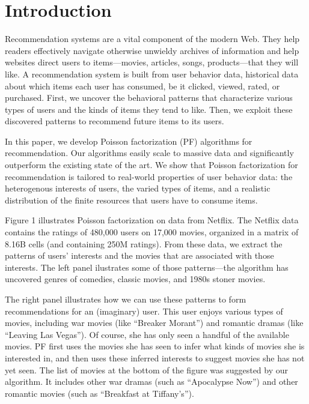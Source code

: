 \section{Introduction}

Recommendation systems are a vital component of the modern Web.  They
help readers effectively navigate otherwise unwieldy archives of
information and help websites direct users to items---movies,
articles, songs, products---that they will like.
A recommendation system is built from user behavior data, historical
data about which items each user has consumed, be it clicked, viewed,
rated, or purchased. First, we uncover the behavioral patterns that
characterize various types of users and the kinds of items they tend
to like.  Then, we exploit these discovered patterns to recommend
future items to its users.

In this paper, we develop Poisson factorization (PF) algorithms for
recommendation.  Our algorithms easily scale to massive data and
significantly outperform the existing state of the art.  We show that
Poisson factorization for recommendation is tailored to real-world
properties of user behavior data: the heterogenous interests of users,
the varied types of items, and a realistic distribution of the finite
resources that users have to consume items.

Figure 1 illustrates Poisson factorization on data from Netflix.  The
Netflix data contains the ratings of 480,000 users on 17,000 movies,
organized in a matrix of 8.16B cells (and containing 250M ratings).
From these data, we extract the patterns of users' interests and the
movies that are associated with those interests.  The left panel
ilustrates some of those patterns---the algorithm has uncovered genres
of comedies, classic movies, and 1980s stoner movies.

The right panel illustrates how we can use these patterns to form
recommendations for an (imaginary) user.  This user enjoys various
types of movies, including war movies (like ``Breaker Morant'') and
romantic dramas (like ``Leaving Las Vegas'').  Of course, she has only
seen a handful of the available movies.  PF first uses the movies she
has seen to infer what kinds of movies she is interested in, and then
uses these inferred interests to suggest movies she has not yet seen.
The list of movies at the bottom of the figure was suggested by our
algorithm. It includes other war dramas (such as ``Apocalypse Now'')
and other romantic movies (such as ``Breakfast at Tiffany's'').

